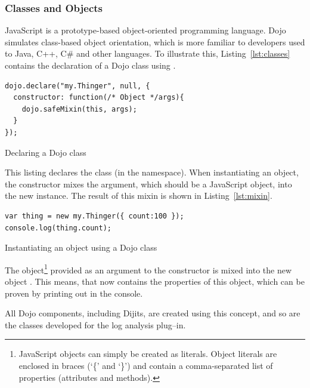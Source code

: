 
\subsubsection{Classes and Objects}
JavaScript is a prototype-based object-oriented programming language. Dojo simulates class-based object orientation, which is more familiar to developers used to Java, C++, C\# and other languages. To illustrate this, Listing~\ref{lst:classes} contains the declaration of a Dojo class using .

\begin{listing}[H]
\begin{verbatim}
dojo.declare("my.Thinger", null, {
  constructor: function(/* Object */args){
    dojo.safeMixin(this, args);
  }
});
\end{verbatim}
\caption{Declaring a Dojo class}
\label{lst:classes}
\end{listing}

This listing declares the  class (in the  namespace). When instantiating an object, the constructor mixes the  argument, which should be a JavaScript object, into the new instance. The result of this mixin is shown in Listing~\ref{lst:mixin}.

\begin{listing}[H]
\begin{verbatim}
var thing = new my.Thinger({ count:100 });
console.log(thing.count);
\end{verbatim}
\caption{Instantiating an object using a Dojo class}
\label{lst:mixin}
\end{listing}

The object\footnote{JavaScript objects can simply be created as literals. Object literals are enclosed in braces (`\{' and `\}') and contain a comma-separated list of properties (attributes and methods).} provided as an argument to the  constructor is mixed into the new object . This means, that  now contains the properties of this object, which can be proven by printing out  in the console.

All Dojo components, including Dijits, are created using this concept, and so are the classes developed for the log analysis plug--in.

